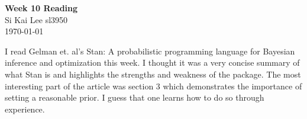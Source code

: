 \documentclass[12pt]{article}
\begin{document}
\begin{center}
  \Large \textbf{Week 10 Reading} \\
  \vspace{0.1in}
  \normalsize Si Kai Lee sl3950 \\
  \today
\end{center}

I read Gelman et. al's Stan: A probabilistic programming language for Bayesian inference and
optimization this week. I thought it was a very concise summary of what Stan is and highlights the strengths and weakness of the package. The most interesting part of the article was section 3 which demonstrates the importance of setting a reasonable prior. I guess that one learns how to do so through experience. 
\end{document}
